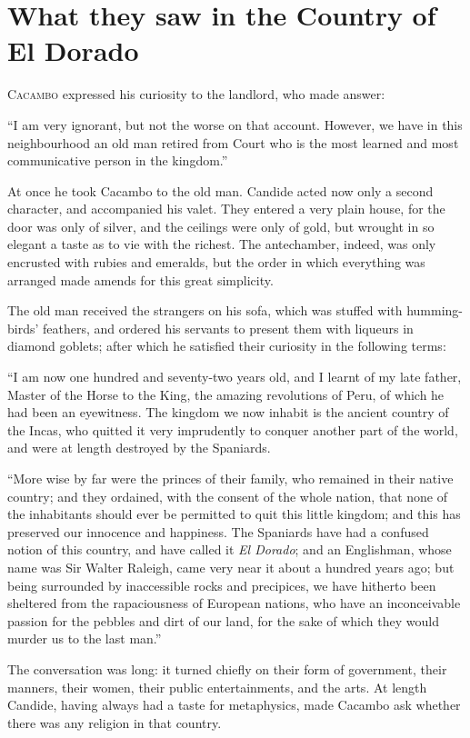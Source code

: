 \chapter{What they saw in the Country of El Dorado}
\lettrine[lraise=0.1,nindent=0em,slope=-.5em]{C}{acambo} expressed his curiosity to the landlord, who made answer:

``I am very ignorant, but not the worse on that account. However, we have in this neighbourhood an old man retired from Court who is the most learned and most communicative person in the kingdom.''

At once he took Cacambo to the old man. Candide acted now only a second character, and accompanied his valet. They entered a very plain house, for the door was only of silver, and the ceilings were only of gold, but wrought in so elegant a taste as to vie with the richest. The antechamber, indeed, was only encrusted with rubies and emeralds, but the order in which everything was arranged made amends for this great simplicity.

The old man received the strangers on his sofa, which was stuffed with humming-birds' feathers, and ordered his servants to present them with liqueurs in diamond goblets; after which he satisfied their curiosity in the following terms:

``I am now one hundred and seventy-two years old, and I learnt of my late father, Master of the Horse to the King, the amazing revolutions of Peru, of which he had been an eyewitness. The kingdom we now inhabit is the ancient country of the Incas, who quitted it very imprudently to conquer another part of the world, and were at length destroyed by the Spaniards.

``More wise by far were the princes of their family, who remained in their native country; and they ordained, with the consent of the whole nation, that none of the inhabitants should ever be permitted to quit this little kingdom; and this has preserved our innocence and happiness. The Spaniards have had a confused notion of this country, and have called it \textit{El Dorado}; and an Englishman, whose name was Sir Walter Raleigh, came very near it about a hundred years ago; but being surrounded by inaccessible rocks and precipices, we have hitherto been sheltered from the rapaciousness of European nations, who have an inconceivable passion for the pebbles and dirt of our land, for the sake of which they would murder us to the last man.''

The conversation was long: it turned chiefly on their form of government, their manners, their women, their public entertainments, and the arts. At length Candide, having always had a taste for metaphysics, made Cacambo ask whether there was any religion in that country.

